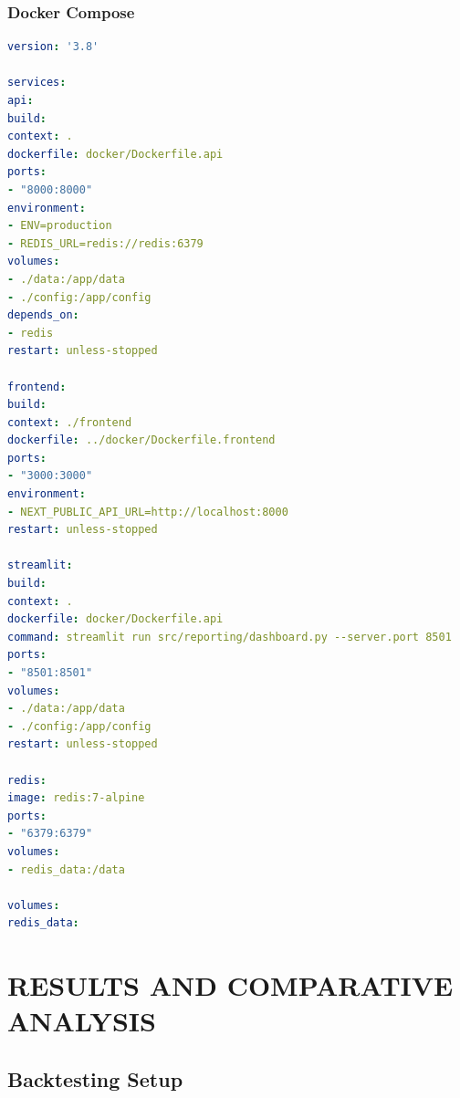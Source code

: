 \documentclass[12pt,a4paper]{report}
\begin{document}
\subsection{Docker Compose}
\begin{lstlisting}[language=yaml, caption=Docker Compose Configuration]
version: '3.8'

services:
api:
build:
context: .
dockerfile: docker/Dockerfile.api
ports:
- "8000:8000"
environment:
- ENV=production
- REDIS_URL=redis://redis:6379
volumes:
- ./data:/app/data
- ./config:/app/config
depends_on:
- redis
restart: unless-stopped

frontend:
build:
context: ./frontend
dockerfile: ../docker/Dockerfile.frontend
ports:
- "3000:3000"
environment:
- NEXT_PUBLIC_API_URL=http://localhost:8000
restart: unless-stopped

streamlit:
build:
context: .
dockerfile: docker/Dockerfile.api
command: streamlit run src/reporting/dashboard.py --server.port 8501
ports:
- "8501:8501"
volumes:
- ./data:/app/data
- ./config:/app/config
restart: unless-stopped

redis:
image: redis:7-alpine
ports:
- "6379:6379"
volumes:
- redis_data:/data

volumes:
redis_data:
\end{lstlisting}

\chapter{RESULTS AND COMPARATIVE ANALYSIS}

\section{Backtesting Setup}
\end{document}
